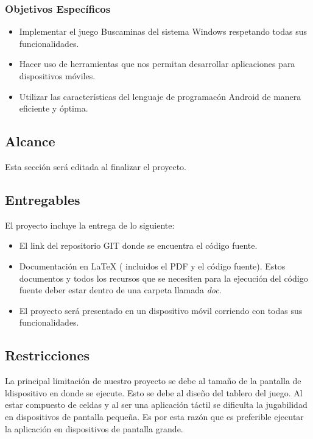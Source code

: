 \documentclass[11pt,a4paper,spanish]{article} %
\begin{document}
\subsubsection{Objetivos Espec\'ificos}
\begin{itemize}
\item Implementar el juego Buscaminas del sistema Windows respetando todas sus funcionalidades.
\item Hacer uso de herramientas que nos permitan desarrollar aplicaciones para dispositivos m\'oviles.
\item Utilizar las caracter\'isticas del lenguaje de programac\'on Android de manera eficiente y \'optima.
\end{itemize}
\subsection{Alcance}
Esta secci\'on ser\'a editada al finalizar el proyecto.
\subsection{Entregables}
El proyecto incluye la entrega de lo siguiente:

\begin{itemize}
\item El link del repositorio GIT donde se encuentra el c\'odigo fuente.
\item Documentación en LaTeX ( incluidos el PDF y el c\'odigo fuente). Estos documentos y todos los recursos que se necesiten para la ejecuci\'on del c\'odigo fuente deber estar dentro de una carpeta llamada \textsl{doc}.
\item  El proyecto ser\'a presentado en un dispositivo m\'ovil corriendo con todas sus funcionalidades.
\end{itemize}

\subsection{Restricciones}
La principal limitaci\'on de nuestro proyecto se debe al tama\~no de la pantalla de ldispositivo en donde se ejecute.
Esto se debe al dise\~no del tablero del juego. Al estar compuesto de celdas y al ser una aplicaci\'on t\'actil se dificulta la jugabilidad en dispositivos de pantalla peque\~na.
Es por esta raz\'on que es preferible ejecutar la aplicaci\'on en dispositivos de pantalla grande.
\end{document}
